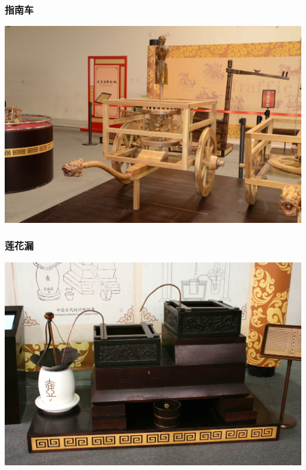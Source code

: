 \documentclass{article}
\begin{document}
\begin{frame}
\frametitle{指南车}
\label{sec-1-1-3}

\includegraphics[width=\textwidth]{image/zhinanche.jpg}
\end{frame}
\begin{frame}
\frametitle{莲花漏}
\label{sec-1-1-4}

\includegraphics[width=\textwidth]{image/lianhualou.jpg}
\end{frame}
\end{document}
